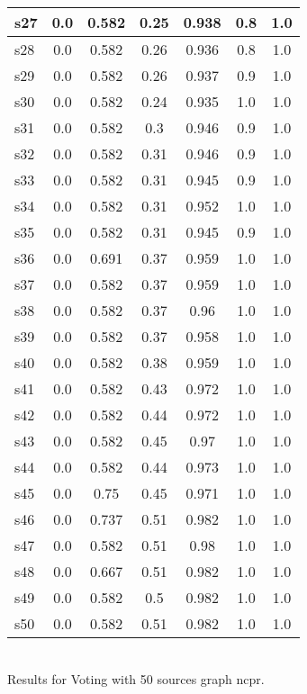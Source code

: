 \documentclass{article}
\begin{document}
\begin{tabular}{|l|c|c|c|c|c|c|}
\hline
s27 &0.0 & 0.582 & 0.25 & 0.938 & 0.8 & 1.0\\
\hline
s28 &0.0 & 0.582 & 0.26 & 0.936 & 0.8 & 1.0\\
\hline
s29 &0.0 & 0.582 & 0.26 & 0.937 & 0.9 & 1.0\\
\hline
s30 &0.0 & 0.582 & 0.24 & 0.935 & 1.0 & 1.0\\
\hline
s31 &0.0 & 0.582 & 0.3 & 0.946 & 0.9 & 1.0\\
\hline
s32 &0.0 & 0.582 & 0.31 & 0.946 & 0.9 & 1.0\\
\hline
s33 &0.0 & 0.582 & 0.31 & 0.945 & 0.9 & 1.0\\
\hline
s34 &0.0 & 0.582 & 0.31 & 0.952 & 1.0 & 1.0\\
\hline
s35 &0.0 & 0.582 & 0.31 & 0.945 & 0.9 & 1.0\\
\hline
s36 &0.0 & 0.691 & 0.37 & 0.959 & 1.0 & 1.0\\
\hline
s37 &0.0 & 0.582 & 0.37 & 0.959 & 1.0 & 1.0\\
\hline
s38 &0.0 & 0.582 & 0.37 & 0.96 & 1.0 & 1.0\\
\hline
s39 &0.0 & 0.582 & 0.37 & 0.958 & 1.0 & 1.0\\
\hline
s40 &0.0 & 0.582 & 0.38 & 0.959 & 1.0 & 1.0\\
\hline
s41 &0.0 & 0.582 & 0.43 & 0.972 & 1.0 & 1.0\\
\hline
s42 &0.0 & 0.582 & 0.44 & 0.972 & 1.0 & 1.0\\
\hline
s43 &0.0 & 0.582 & 0.45 & 0.97 & 1.0 & 1.0\\
\hline
s44 &0.0 & 0.582 & 0.44 & 0.973 & 1.0 & 1.0\\
\hline
s45 &0.0 & 0.75 & 0.45 & 0.971 & 1.0 & 1.0\\
\hline
s46 &0.0 & 0.737 & 0.51 & 0.982 & 1.0 & 1.0\\
\hline
s47 &0.0 & 0.582 & 0.51 & 0.98 & 1.0 & 1.0\\
\hline
s48 &0.0 & 0.667 & 0.51 & 0.982 & 1.0 & 1.0\\
\hline
s49 &0.0 & 0.582 & 0.5 & 0.982 & 1.0 & 1.0\\
\hline
s50 &0.0 & 0.582 & 0.51 & 0.982 & 1.0 & 1.0\\
\hline
\end{tabular}\\

\noindent Results for Voting with 50 sources graph ncpr.
\end{document}
